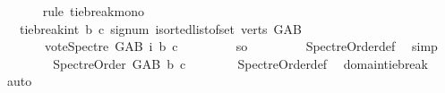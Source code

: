 \begin{isabellebody}
\ \ \ \ \ \ \isamarkupfalse%
{\isacharparenleft}{\kern0pt}rule\ tie{\isacharunderscore}{\kern0pt}break{\isacharunderscore}{\kern0pt}mono{\isacharparenright}{\kern0pt}\isanewline
\ \ \ \ \isamarkupfalse%
\ \isamarkupfalse%
\ {\isachardoublequoteopen}{}\ {\isasymle}\ tie{\isacharunderscore}{\kern0pt}break{\isacharunderscore}{\kern0pt}int\ b\ c\ {\isacharparenleft}{\kern0pt}signum\ {\isacharparenleft}{\kern0pt}{\isasymSum}i{\isasymleftarrow}sorted{\isacharunderscore}{\kern0pt}list{\isacharunderscore}{\kern0pt}of{\isacharunderscore}{\kern0pt}set\ {\isacharparenleft}{\kern0pt}verts\ G{\isacharunderscore}{\kern0pt}AB{\isacharparenright}{\kern0pt}{\isachardot}{\kern0pt}\isanewline
\ \ \ \ \ \ \ vote{\isacharunderscore}{\kern0pt}Spectre\ G{\isacharunderscore}{\kern0pt}AB\ i\ b\ c{\isacharparenright}{\kern0pt}{\isacharparenright}{\kern0pt}\ {\isachardoublequoteclose}\isanewline
\ \ \ \ \ \ \isamarkupfalse%
\ so\ \isanewline
\ \ \ \ \ \ \isamarkupfalse%
\ Spectre{\isacharunderscore}{\kern0pt}Order{\isacharunderscore}{\kern0pt}def\ \isamarkupfalse%
\ simp\isanewline
\ \ \ \ \isamarkupfalse%
\ \isamarkupfalse%
\ {\isachardoublequoteopen}\ Spectre{\isacharunderscore}{\kern0pt}Order\ G{\isacharunderscore}{\kern0pt}AB\ b\ c{\isachardoublequoteclose}\isanewline
\ \ \ \ \ \ \isamarkupfalse%
\ Spectre{\isacharunderscore}{\kern0pt}Order{\isacharunderscore}{\kern0pt}def\ \isamarkupfalse%
\ domain{\isacharunderscore}{\kern0pt}tie{\isacharunderscore}{\kern0pt}break\ \isamarkupfalse%
\ auto\isanewline
\ \ \isamarkupfalse%
\isanewline
{}\isamarkupfalse%
%
\endisatagproof
{\isafoldproof}%
%
\isadelimproof
\isanewline
%
\endisadelimproof
\isanewline
%
\isadelimtheory
\isanewline
%
\endisadelimtheory
%
\isatagtheory
{}\isamarkupfalse%
%
\endisatagtheory
{\isafoldtheory}%
%
\isadelimtheory
%
\endisadelimtheory
%
\end{isabellebody}%
\endinput
